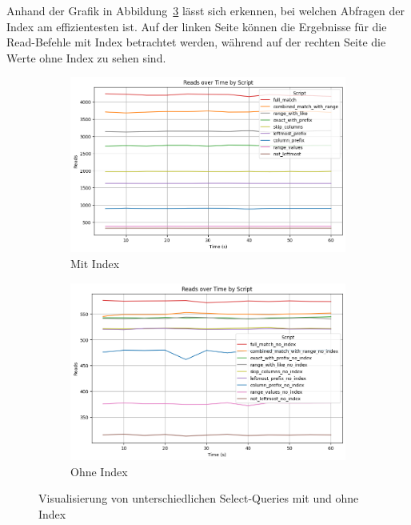 Anhand der Grafik in Abbildung~\ref{fig:indexing-b-tree-query-reads} lässt sich erkennen, bei welchen Abfragen der Index am effizientesten ist.
Auf der linken Seite können die Ergebnisse für die Read-Befehle mit Index betrachtet werden, während auf der rechten Seite die Werte ohne Index zu sehen sind.

\vspace{-8pt}
\begin{figure}[H]
    \centering
    \begin{subfigure}[t]{0.48\textwidth}
        \centering
        \includegraphics[width=\textwidth]{PNGs/Script/Index/B_Tree/b-tree-query-differences/Reads}
        \caption{Mit Index}
        \label{indexing-b-tree-query-reads-index}
    \end{subfigure}
    \hfill
    \begin{subfigure}[t]{0.48\textwidth}
        \centering
        \includegraphics[width=\textwidth]{PNGs/Script/Index/B_Tree/b-tree-query-differences-no-index/Reads}
        \caption{Ohne Index}
        \label{indexing-b-tree-query-reads-no-index}
    \end{subfigure}
    \vspace{-5pt}
    \caption[B-Tree-Indexing: Unterschiedliche Selects mit Index und Ohne]{Visualisierung von unterschiedlichen Select-Queries mit und ohne Index}
    \label{fig:indexing-b-tree-query-reads}
\end{figure}
\vspace{-15pt}

